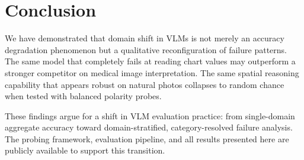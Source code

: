 \documentclass[conference]{IEEEtran}
\begin{document}
\section{Conclusion}

We have demonstrated that domain shift in VLMs is not merely an accuracy degradation phenomenon but a qualitative reconfiguration of failure patterns. The same model that completely fails at reading chart values may outperform a stronger competitor on medical image interpretation. The same spatial reasoning capability that appears robust on natural photos collapses to random chance when tested with balanced polarity probes.

These findings argue for a shift in VLM evaluation practice: from single-domain aggregate accuracy toward domain-stratified, category-resolved failure analysis. The probing framework, evaluation pipeline, and all results presented here are publicly available to support this transition.


\end{document}
